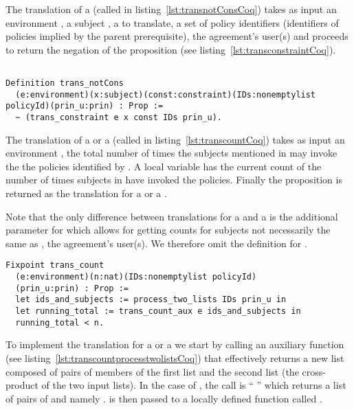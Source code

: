 The translation of a  (called  in listing~\ref{lst:transnotConsCoq}) takes as input 
an environment , a subject , a   to translate, a set of policy identifiers  (identifiers of policies implied by the parent prerequisite), the agreement's user(s)  and proceeds to return the negation of the proposition  (see listing~\ref{lst:transconstraintCoq}).

\begin{lstlisting}

Definition trans_notCons
  (e:environment)(x:subject)(const:constraint)(IDs:nonemptylist policyId)(prin_u:prin) : Prop :=
  ~ (trans_constraint e x const IDs prin_u).
\end{lstlisting}


The translation of a  or a  (called  in listing~\ref{lst:transcountCoq}) takes as input an environment ,  the total number of times the subjects mentioned in  may invoke the 
the policies identified by .
A local variable  has the current count of the number of times subjects in  have invoked the policies. Finally the proposition  is returned as the translation for a  or a .

Note that the only difference between translations for a  and a  is the additional  parameter for  which allows for getting counts for subjects not necessarily the same as , the agreement's user(s). We therefore omit the definition for .


\begin{minipage}[c]{0.95\textwidth}
\begin{lstlisting}
Fixpoint trans_count
  (e:environment)(n:nat)(IDs:nonemptylist policyId)
  (prin_u:prin) : Prop :=
  let ids_and_subjects := process_two_lists IDs prin_u in
  let running_total := trans_count_aux e ids_and_subjects in
  running_total < n.
\end{lstlisting}
\end{minipage}


To implement the translation for a  or a  we start by calling an auxiliary function  (see listing~\ref{lst:transcountprocesstwolistsCoq}) that effectively returns a new list composed of pairs of members of the first list and the second list (the cross-product of the two input lists). In the case of , the call is ``  '' which returns a list of pairs of  and  namely .  is then passed to a locally defined function called .

